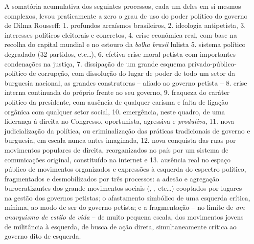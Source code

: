 A somatória acumulativa dos seguintes processos, cada um deles em si
mesmos complexos, levou praticamente a zero o grau de uso do poder
político do governo de Dilma Rousseff: 1. profundos arcaísmos
brasileiros, 2. ideologia antipetista, 3. interesses políticos
eleitorais e concretos, 4. crise econômica real, com base na recolha do
capital mundial e no estouro da \emph{bolha brasil} lulista 5. sistema
político degradado (32 partidos, etc…), 6. efetiva crise moral petista
com importantes condenações na justiça, 7. dissipação de um grande
esquema privado-público-político de corrupção, com dissolução do lugar
de poder de todo um setor da burguesia nacional, as grandes construtoras
-- aliado ao governo petista -- 8. crise interna continuada do próprio
 frente ao seu governo, 9. fraqueza do caráter político da presidente,
com ausência de qualquer carisma e falta de ligação orgânica com
qualquer setor social, 10. emergência, neste quadro, de uma liderança à
direita no Congresso, oportunista, agressiva e \emph{produtiva}, 11.
nova judicialização da política, ou criminalização das práticas
tradicionais de governo e burguesia, em escala nunca antes imaginada,
12. nova conquista das ruas por movimentos populares de direita,
reorganizados no país por um sistema de comunicações original,
constituído na internet e 13. ausência real no espaço público de
movimentos organizados e expressões à esquerda do espectro político,
fragmentados e desmobilizados por três processos: a adesão e agregação
burocratizantes dos grande movimentos sociais (, , etc…)
cooptados por lugares na gestão dos governos petistas; o afastamento
simbólico de uma esquerda crítica, mínima, ao modo de ser do governo
petista; e a fragmentação -- no limite de \emph{um anarquismo de estilo
de vida} -- de muito pequena escala, dos movimentos jovens de militância
à esquerda, de busca de ação direta, simultaneamente crítica ao governo
dito de esquerda.

